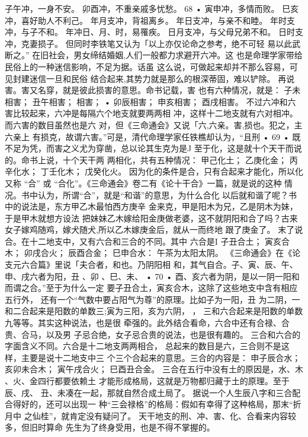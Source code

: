 子午冲，一身不安。
卯酉冲，不重亲戚多忧愁。
68 •
寅申冲，多情而败。
巳亥冲，喜好助人不利己。
年月支冲，背祖离乡。
年日支冲，与亲不和睦。
年时支冲，与子不和。
年冲日、月、时，易罹疾。
日月支冲，与父母兄弟不和。
日时支冲，克妻损子。
但同时李铁笔又认为「以上亦仅论命之参考，绝不可轻
易以此武断之。”
在旧社会，男女缔结婚姻,人们一般都力求避开六冲。这
也是命理学家带给民俗上的一种迷信影响，不足为据。话虽
这么说，可做起来却并不那么容易，可见封建迷信一旦和民俗
结合起来,其势力就是那么的根深蒂固，难以铲除。
再说害。害又名穿，就是彼此损害的意思。命书记载，害
也有六种情况，就是：
子未相害；
丑午相害；
相害； •
卯辰相害；
申亥相害；
酉戌相害。
不过六冲和六害比较起来，六冲是每隔六个地支就要两两相
冲，这样十二地支就有六对相冲。而六害的数目虽然也是六
对，但《三命通会》又说「六,六亲。害,损也。犯之，主六亲上
有损克，故谓六害。”可是，清代命理学家任铁樵却认为，“且刑
• 69 •
既不足为凭，而害之义尤为穿凿，总以论其生克为是J
至于化，这是就十个天干而说的。命书上说，十个天干两
两相化，共有五种情况：
甲己化土；
乙庚化金；
丙辛化水；
丁壬化木；
戊癸化火。
因为化的条件是合，只有合起来才能化，所以化又称 “合” 或
“合化”。《三命通会》卷二有《论十干合》一篇，就是说的这种
情况。书中认为，所谓“合”，就是“和谐”的意思，为什么合化
以后就和谐了呢？书中的说法是，东方甲乙木最怕西方庚辛
金来克，甲是阳木为兄，乙是阴木为妹，于是甲木就想方设法
把妹妹乙木嫁给阳金庚做老婆，这不就阴阳和合了吗？古来
女子嫁鸡随鸡，嫁犬随犬,所以乙木嫁庚金后，就从一而终地
跟了庚金了。
末了说合。在十二地支中，又有六合和三合的不同。其中
六合是I
子丑合土；
寅亥合木；
卯戌合火；
辰酉合金；
巳申合水：
午茶为太阳太阴。
《三命通会》在《论支元六合篇》里说「夫合者，和也。乃阴阳相
和，其气自合。子、寅、辰、午、申、戌六者为阳，丑 、卯 、巳、未、
• 70 •
酉、亥六者为阴，是以一阴一阳和而谓之合。”至于为什么一定
要子丑合土，寅亥合木，这除了这些地支中含有相应五行外，
还有一个“气数中要占阳气为尊”的原理。比如子为一阳，丑
为二阴，一和二合起来是阳数的单数三;寅为三阳，亥为六阴，
， 三和六合起来是阳数的单数九等等。其实这种说法，也是很
牵强的。此外结合看命，六合中还有合禄、合贵、合马，以及男
子忌合绝，女子忌合贵的说法，也是很有趣的。
三合和六合的字面含义不同。六合是十二地支两两相合，
总起来的数目是六，三合则不是这样，主要是说十二地支中三
个三个合起来的意思。三合的内容是：
申子辰合水；
亥卯未合木；
寅午戌合火；
巳酉丑合金。
三合在五行中没有土的原因是，水、木 、火、金四行都要依赖土
才能形成格局，这就是万物都归藏于土的原理。至于辰、戌、
丑、未凑在一起，那就自然合成土局了。
据说一个人生辰八字和三合配合得好的，还可以出现一
种“三会禄格”的格局：假如有幸得了这种格局，那末“折月中
之仙桂”，就肯定没有疑问了。
天干地支的刑、冲、害、化、合看来内容较多，但旧时算命
先生为了终身受用，也是不得不掌握的。

